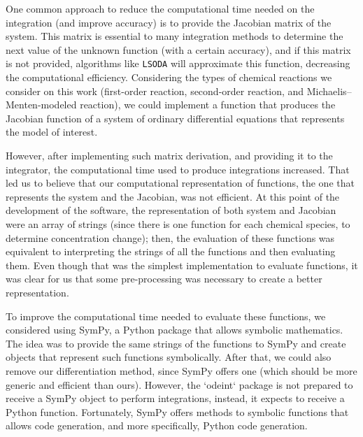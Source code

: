One common approach to reduce the computational time needed on the
integration (and improve accuracy) is to provide the Jacobian matrix of
the system. This matrix is essential to many integration methods to
determine the next value of the unknown function (with a certain
accuracy), and if this matrix is not provided, algorithms like 
{\tt LSODA} will approximate this function, decreasing the computational 
efficiency. Considering the types of chemical reactions we consider on
this work (first-order reaction, second-order reaction, and
Michaelis--Menten-modeled reaction), we could implement a function that 
produces the Jacobian function of a system of ordinary differential 
equations that represents the model of interest.

However, after implementing such matrix derivation, and providing it to
the integrator, the computational time used to produce integrations
increased. That led us to believe that our computational representation 
of functions, the one that represents the system and the Jacobian, was
not efficient. At this point of the development of the software, the
representation of both system and Jacobian were an array of strings
(since there is one function for each chemical species, to determine
concentration change); then, the evaluation of these functions was
equivalent to interpreting the strings of all the functions and then
evaluating them. Even though that was the simplest implementation to
evaluate functions, it was clear for us that some pre-processing was
necessary to create a better representation.

To improve the computational time needed to evaluate these functions, we
considered using SymPy, a Python package that allows symbolic
mathematics. The idea was to provide the same strings of the functions
to SymPy and create objects that represent such functions symbolically. 
After that, we could also remove our differentiation method, since SymPy
offers one (which should be more generic and efficient than ours). 
However, the `odeint` package is not prepared to receive a SymPy object 
to perform integrations, instead, it expects to receive a Python 
function. Fortunately, SymPy offers methods to symbolic functions that 
allows code generation, and more specifically, Python code generation.

